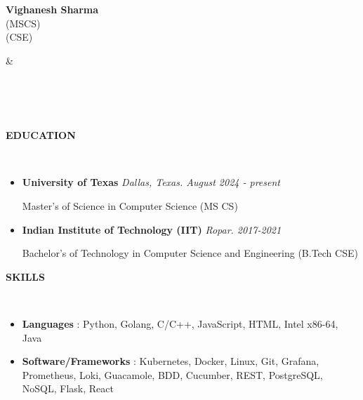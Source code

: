 \documentclass[a4paper,10pt]{article}
\newcommand{\lsep}{-0.6cm}
\newcommand{\resheading}[1]{{\small \colorbox{mygrey}{\begin{minipage}{0.975\textwidth}{\textbf{#1 \vphantom{p\^{E}}}}\end{minipage}}}}
\begin{document}

\begin{minipage}{0.5\linewidth}
\textbf{\Large Vighanesh Sharma}\\
 (MSCS)\\
 (CSE)\\
\end{minipage}
&\hspace{2.5cm}
\begin{minipage}{0.5\linewidth}
\\
\\
 \\
\end{minipage}

\resheading{\textbf{EDUCATION} }\\[\lsep]
\vspace{1.0pt}
\begin{itemize}
\item \textbf{University of Texas} \hfill \emph{Dallas, Texas. August 2024 - present}
\setlength{\itemsep}{1pt}
\setlength{\parskip}{0pt}
\setlength{\parsep}{0pt}

Master's of Science in Computer Science (MS CS)

\item \textbf{Indian Institute of Technology (IIT)} \hfill \emph{Ropar. 2017-2021}
\setlength{\itemsep}{1pt}
\setlength{\parskip}{0pt}
\setlength{\parsep}{0pt}

Bachelor's of Technology in Computer Science and Engineering (B.Tech CSE)

\end{itemize}
\vspace{-5pt}

\resheading{\textbf{SKILLS} }\\[\lsep]
\vspace{1.0pt}
\begin{itemize}[itemsep=0.1pt]

\item \noindent \textbf{Languages} : Python, Golang, C/C++, JavaScript, HTML, Intel x86-64, Java
\item \noindent \textbf{Software/Frameworks} : Kubernetes, Docker, Linux, Git, Grafana, Prometheus, Loki, Guacamole, BDD, Cucumber, REST, PostgreSQL, NoSQL, Flask, React
\end{itemize}
\vspace{-5pt}
\end{document}
